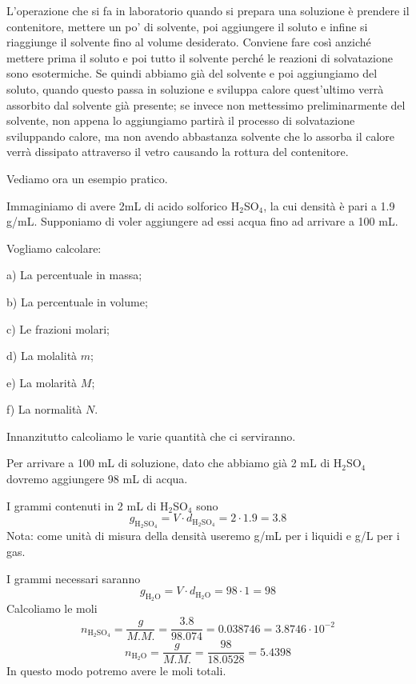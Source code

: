 \vspace{0.4cm}L'operazione che si fa in laboratorio quando si prepara una soluzione è prendere il contenitore, mettere un po' di solvente, poi aggiungere il soluto e infine si riaggiunge il solvente fino al volume desiderato. Conviene fare così anziché mettere prima il soluto e poi tutto il solvente perché le reazioni di solvatazione sono esotermiche. Se quindi abbiamo già del solvente e poi aggiungiamo del soluto, quando questo passa in soluzione e sviluppa calore quest'ultimo verrà assorbito dal solvente già presente; se invece non mettessimo preliminarmente del solvente, non appena lo aggiungiamo partirà il processo di solvatazione sviluppando calore, ma non avendo abbastanza solvente che lo assorba il calore verrà dissipato attraverso il vetro causando la rottura del contenitore.

\vspace{0.2cm}Vediamo ora un esempio pratico.

Immaginiamo di avere 2mL di acido solforico H$_2$SO$_4$, la cui densità è pari a 1.9 g/mL. Supponiamo di voler aggiungere ad essi acqua fino ad arrivare a 100 mL.

Vogliamo calcolare:

\vspace{0.2cm}a) La percentuale in massa;

\vspace{0.2cm}b) La percentuale in volume;

\vspace{0.2cm}c) Le frazioni molari;

\vspace{0.2cm}d) La molalità $m$;

\vspace{0.2cm}e) La molarità $M$;

\vspace{0.2cm}f) La normalità $N$.

\vspace{0.2cm}Innanzitutto calcoliamo le varie quantità che ci serviranno.

Per arrivare a 100 mL di soluzione, dato che abbiamo già 2 mL di H$_2$SO$_4$ dovremo aggiungere 98 mL di acqua.

I grammi contenuti in 2 mL di H$_2$SO$_4$ sono
$$g_{\text{H}_2\text{SO}_4}=V\cdot d_{\text{H}_2\text{SO}_4}= 2 \cdot 1.9=3.8$$
Nota: come unità di misura della densità useremo g/mL per i liquidi e g/L per i gas.

I grammi necessari saranno
$$g_{\text{H}_2\text{O}}= V \cdot d_{\text{H}_2\text{O}}= 98 \cdot 1 = 98$$
Calcoliamo le moli
$$n_{\text{H}_2\text{SO}_4}=\frac{g}{M.M.}=\frac{3.8}{98.074}=0.038746=3.8746 \cdot 10^{-2}$$
$$n_{\text{H}_2\text{O}}=\frac{g}{M.M.}=\frac{98}{18.0528}=5.4398$$
In questo modo potremo avere le moli totali.


